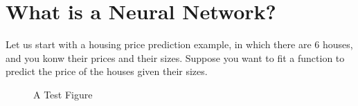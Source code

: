 \section{What is a Neural Network?}

Let us start with a housing price prediction example, in which there are $6$ houses, and you konw their prices and their sizes. Suppose you want to fit a function to predict the price of the houses given their sizes.

\begin{figure}[h!]
    \centering
    \caption{A Test Figure}
\end{figure}
